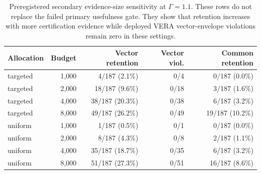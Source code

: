 \begin{table}[t]
\centering
\small
\begin{tabular}{@{}lrrrr@{}}
\toprule
Allocation & Budget & Vector retention & Vector viol. & Common retention \\
\midrule
targeted & 1,000 & 4/187 (2.1\%) & 0/4 & 0/187 (0.0\%) \\
targeted & 2,000 & 18/187 (9.6\%) & 0/18 & 3/187 (1.6\%) \\
targeted & 4,000 & 38/187 (20.3\%) & 0/38 & 6/187 (3.2\%) \\
targeted & 8,000 & 49/187 (26.2\%) & 0/49 & 19/187 (10.2\%) \\
uniform & 1,000 & 1/187 (0.5\%) & 0/1 & 0/187 (0.0\%) \\
uniform & 2,000 & 8/187 (4.3\%) & 0/8 & 2/187 (1.1\%) \\
uniform & 4,000 & 35/187 (18.7\%) & 0/35 & 6/187 (3.2\%) \\
uniform & 8,000 & 51/187 (27.3\%) & 0/51 & 16/187 (8.6\%) \\
\bottomrule
\end{tabular}
\caption{Preregistered secondary evidence-size sensitivity at $\Gamma=1.1$. These rows do not replace the failed primary usefulness gate. They show that retention increases with more certification evidence while deployed VERA vector-envelope violations remain zero in these settings.}
\label{tab:controlled-budget}
\end{table}
